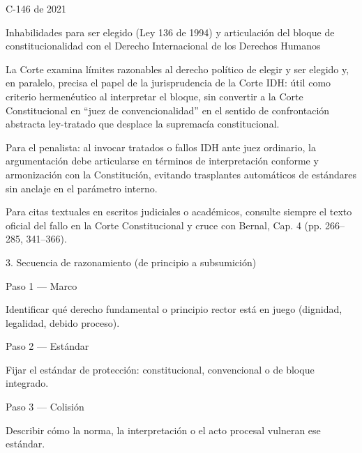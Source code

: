 \documentclass[11pt,a4paper]{article}
\begin{document}
            C-146 de 2021\par
            Inhabilidades para ser elegido (Ley 136 de 1994) y articulación del bloque de constitucionalidad con el Derecho Internacional de los Derechos Humanos\par
            La Corte examina límites razonables al derecho político de elegir y ser elegido y, en paralelo, precisa el papel de la jurisprudencia de la Corte IDH: útil como criterio hermenéutico al interpretar el bloque, sin convertir a la Corte Constitucional en “juez de convencionalidad” en el sentido de confrontación abstracta ley-tratado que desplace la supremacía constitucional.\par
            Para el penalista: al invocar tratados o fallos IDH ante juez ordinario, la argumentación debe articularse en términos de interpretación conforme y armonización con la Constitución, evitando trasplantes automáticos de estándares sin anclaje en el parámetro interno.\par







        Para citas textuales en escritos judiciales o académicos, consulte siempre el texto oficial del fallo en la Corte Constitucional y cruce con Bernal, Cap. 4 (pp. 266–285, 341–366).\par





      3. Secuencia de razonamiento (de principio a subsumición)\par



          Paso 1 — Marco\par
          Identificar qué derecho fundamental o principio rector está en juego (dignidad, legalidad, debido proceso).\par




          Paso 2 — Estándar\par
          Fijar el estándar de protección: constitucional, convencional o de bloque integrado.\par




          Paso 3 — Colisión\par
          Describir cómo la norma, la interpretación o el acto procesal vulneran ese estándar.\par
\end{document}
